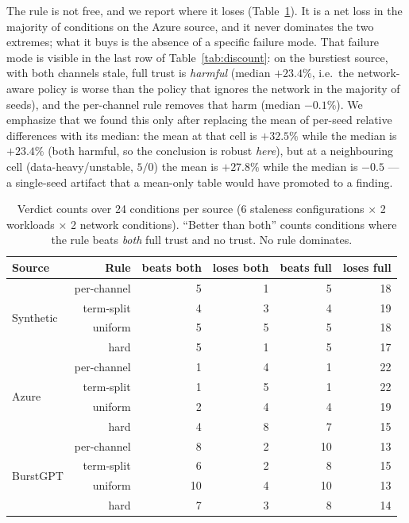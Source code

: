 The rule is not free, and we report where it loses (Table~\ref{tab:verdict}). It is a net loss in
the majority of conditions on the Azure source, and it never dominates the two extremes; what it
buys is the absence of a specific failure mode. That failure mode is visible in the last row of
Table~\ref{tab:discount}: on the burstiest source, with both channels stale, full trust is
\emph{harmful} (median $+23.4\%$, i.e.~the network-aware policy is worse than the policy that
ignores the network in the majority of seeds), and the per-channel rule removes that harm
(median $-0.1\%$). We emphasize that we found this only after replacing the mean of per-seed
relative differences with its median: the mean at that cell is $+32.5\%$ while the median is
$+23.4\%$ (both harmful, so the conclusion is robust \emph{here}), but at a neighbouring cell
(data-heavy/unstable, $5/0$) the mean is $+27.8\%$ while the median is $-0.5$ --- a
single-seed artifact that a mean-only table would have promoted to a finding.

\begin{table}[t]
\centering
\caption{Verdict counts over 24 conditions per source (6 staleness configurations $\times$ 2
workloads $\times$ 2 network conditions). ``Better than both'' counts conditions where the rule
beats \emph{both} full trust and no trust. No rule dominates.}
\label{tab:verdict}
\footnotesize
\setlength{\tabcolsep}{4pt}
\begin{tabular}{@{}lrrrrr@{}}
\toprule
Source & Rule & beats both & loses both & beats full & loses full \\
\midrule
\multirow{4}{*}{Synthetic} & per-channel & 5 & 1 & 5 & 18 \\
                           & term-split  & 4 & 3 & 4 & 19 \\
                           & uniform     & 5 & 5 & 5 & 18 \\
                           & hard        & 5 & 1 & 5 & 17 \\
\midrule
\multirow{4}{*}{Azure}     & per-channel & 1 & 4 & 1 & 22 \\
                           & term-split  & 1 & 5 & 1 & 22 \\
                           & uniform     & 2 & 4 & 4 & 19 \\
                           & hard        & 4 & 8 & 7 & 15 \\
\midrule
\multirow{4}{*}{BurstGPT}  & per-channel & 8 & 2 & 10 & 13 \\
                           & term-split  & 6 & 2 & 8 & 15 \\
                           & uniform     & 10 & 4 & 10 & 13 \\
                           & hard        & 7 & 3 & 8 & 14 \\
\bottomrule
\end{tabular}
\end{table}

